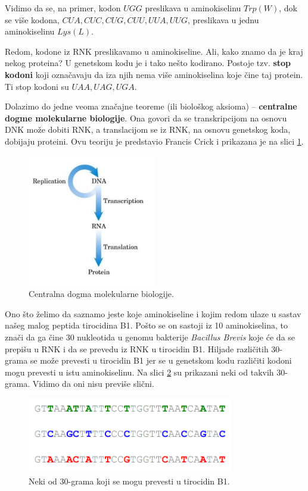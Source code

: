 Vidimo da se, na primer, kodon $UGG$ preslikava u aminokiselinu $Trp (W)$, dok se više kodona, $CUA, CUC, CUG, CUU, UUA, UUG$, preslikava u jednu aminokiselinu $Lys (L)$. 

Redom, kodone iz RNK preslikavamo u aminokiseline. Ali, kako znamo da je kraj nekog proteina? U genetskom kodu je i tako nešto kodirano. Postoje tzv. \textbf{stop kodoni} koji označavaju da iza njih nema više aminokiselina koje čine taj protein. Ti stop kodoni su $UAA, UAG, UGA$. 

\newpage


Dolazimo do jedne veoma značajne teoreme (ili biološkog aksioma) -- \textbf{centralne dogme molekularne biologije}. Ona govori da se transkripcijom na osnovu DNK može dobiti RNK, a translacijom se iz RNK, na osnovu genetskog koda, dobijaju proteini. Ovu teoriju je predstavio Francis Crick i prikazana je na slici \ref{slika:centralnaDogma}.
\begin{figure}[h!]
	\centering
	\includegraphics[width=0.5\textwidth]{poglavlja/4/slike/centralnaDog.jpg}
	\caption{Centralna dogma molekularne biologije.}
	\label{slika:centralnaDogma}
\end{figure} 



Ono što želimo da saznamo jeste koje aminokiseline i kojim redom ulaze u sastav našeg malog peptida tirocidina B1. Pošto se on sastoji iz 10 aminokiselina, to znači da ga čine 30 nukleotida u genomu bakterije \textit{Bacillus Brevis} koje će da se prepišu u RNK i da se prevedu iz RNK u tirocidin B1. Hiljade različitih $30$-grama se može prevesti u tirocidin B1 jer se u genetskom kodu različiti kodoni mogu prevesti u istu aminokiselinu. Na slici \ref{slika:30grami} su prikazani neki od takvih $30$-grama. Vidimo da oni nisu previše slični.
\begin{figure}[h!]
	\centering
	\includegraphics[width=0.8\textwidth]{poglavlja/4/slike/30grami.png}
	\caption{Neki od $30$-grama koji se mogu prevesti u tirocidin B1.}
	\label{slika:30grami}
\end{figure} 
\noindent

